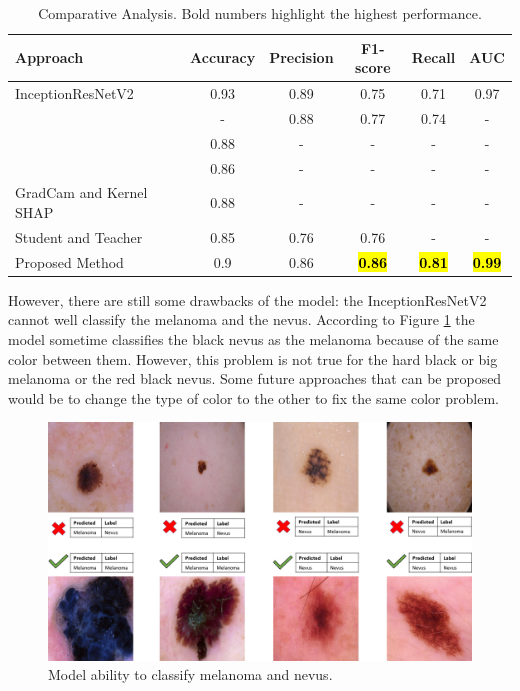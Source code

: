\documentclass[sensors,article,accept,pdftex,moreauthors]{Definitions/mdpi}
\begin{document}
	
	
	\begin{table}[H]
		\caption{Comparative Analysis. Bold numbers highlight the highest performance.}
		\label{table:comparative-analysis}
				\setlength{\tabcolsep}{1.6mm}\begin{tabular}{ p{5cm}  c  c  c  c  c }
\toprule
\textbf{Approach} & \textbf{Accuracy} & \textbf{Precision} & \textbf{F1-score} & \textbf{Recall} & \textbf{AUC}\\
\midrule
InceptionResNetV2~\cite{03358} & 0.93 & 0.89 & 0.75 & 0.71 & 0.97\\
\midrule
\cite{03798} & - & 0.88 & 0.77 & 0.74 & - \\
\midrule
\cite{09418} & 0.88 & - & - & - & - \\
\midrule
\cite{01284} & 0.86 & - & - & - & - \\
\midrule
GradCam and Kernel SHAP~\cite{06612} & 0.88 & - & - & - & - \\
\midrule
Student and Teacher~\cite{03225} & 0.85 & 0.76 & 0.76 & - & - \\
\midrule
Proposed Method & 0.9	& 0.86 & \hl{\textbf{0.86}} & \hl{\textbf{0.81}} & \hl{\textbf{0.99}}%
\\
\bottomrule
		\end{tabular}
	\end{table} 

However, there are still some drawbacks of the model: the InceptionResNetV2 cannot well classify the melanoma and the nevus. According to Figure \ref{fig:nevusVSmela} the model sometime classifies the black nevus as the melanoma because of the same color between them. However, this problem is not true for the hard black or big melanoma or the red black nevus. Some future approaches that can be proposed would be to change the type of color to the other to fix the same color problem.    
	
	\begin{figure}[H]
		\centering
		\includegraphics[width=0.9\linewidth]{Definitions/img_class_nevus_mela}
		\caption{Model ability to classify melanoma and nevus.}
		\label{fig:nevusVSmela}
	\end{figure}
	
\end{document}

